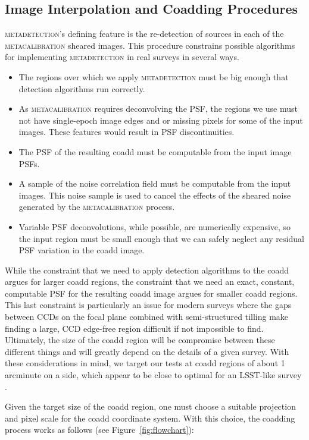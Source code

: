 \documentclass[twocolappendix, appendixfloats, numberedappendix, twocolumn, apj]{openjournal}
\newcommand{\mdet}{\textsc{metadetection}\xspace}
\newcommand{\mcal}{\textsc{metacalibration}\xspace}
\begin{document}
\subsection{Image Interpolation and Coadding Procedures}\label{sec:coadd}

\mdet's defining feature is the re-detection of sources in each of the \mcal
sheared images. This procedure constrains possible algorithms for implementing
\mdet in real surveys in several ways.

\begin{itemize}
  \item The regions over which we apply \mdet
  must be big enough that detection algorithms run correctly.
  \item As \mcal requires deconvolving the PSF, the regions we use must not have
  single-epoch image edges and or missing pixels for some of the input images. These features
  would result in PSF discontinuities.
  \item The PSF of the resulting coadd must be computable from the input image PSFs.
  \item A sample of the noise correlation field must be computable from the input images.
  This noise sample is used to cancel the effects of the sheared noise generated
  by the \mcal process.
  \item Variable PSF deconvolutions, while possible, are numerically expensive, so the input
  region must be small enough that we can safely neglect any residual PSF variation in the coadd image.
\end{itemize}

While the constraint that we need to apply detection algorithms to the coadd argues
for larger coadd regions, the constraint that we need an exact, constant, computable
PSF for the resulting coadd image argues for smaller coadd regions. This last constraint is
particularly an issue for modern surveys where the gaps between CCDs on the focal plane
combined with semi-structured tilling make finding a large, CCD edge-free region difficult
if not impossible to find. Ultimately, the size of the coadd region will be compromise
between these different things and will greatly depend on the details of a given survey.
With these considerations in mind, we target our tests at coadd regions of about 1 arcminute
on a side, which appear to be close to optimal for an LSST-like survey \citep{ArmstrongCoadd}.

Given the target size of the coadd region, one must choose a suitable projection
and pixel scale for the coadd coordinate system. With this choice, the coadding process
works as follows (see Figure~\ref{fig:flowchart}):
\end{document}
